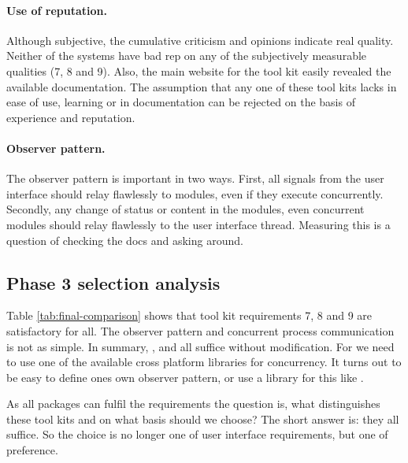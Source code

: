 \paragraph{Use of reputation.} Although subjective, the cumulative criticism
and opinions indicate real quality. Neither of the systems have bad rep on any
of the subjectively measurable qualities (7, 8 and 9). Also, the main website
for the tool kit easily revealed the available documentation. The assumption
that any one of these tool kits lacks in ease of use, learning or in
documentation can be rejected on the basis of experience and reputation. 

\paragraph{Observer pattern.} The observer pattern is important in two ways.
First, all signals from the user interface should relay flawlessly to modules,
even if they execute concurrently. Secondly, any change of status or content in
the modules, even concurrent modules should relay flawlessly to the user
interface thread. Measuring this is a question of checking the docs and asking
around. 


\subsection{Phase 3 selection analysis}

Table \ref{tab:final-comparison} shows that tool kit requirements 7, 8 and 9
are satisfactory for all. The observer pattern and concurrent process
communication is not as simple. In summary, ,  and 
all suffice without modification. For  we need to use one of the
available cross platform libraries for concurrency. It turns out to be easy
to define ones own observer pattern, or use a library for this like .

As all packages can fulfil the requirements the question is, what distinguishes
these tool kits and on what basis should we choose? The short answer is: they
all suffice. So the choice is no longer one of user interface requirements, but
one of preference. 

